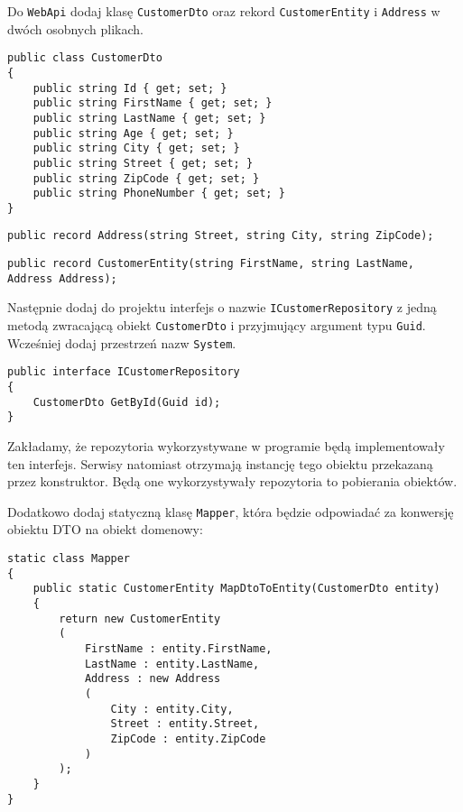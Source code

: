 Do \texttt{WebApi} dodaj klasę \texttt{CustomerDto} oraz rekord \texttt{CustomerEntity} i \texttt{Address} w dwóch osobnych plikach.
\begin{lstlisting}[caption = Klasa \texttt{CustomerDto}]
public class CustomerDto
{
	public string Id { get; set; }
	public string FirstName { get; set; }
	public string LastName { get; set; }
	public string Age { get; set; }
	public string City { get; set; }
	public string Street { get; set; }
	public string ZipCode { get; set; }
	public string PhoneNumber { get; set; }
}
\end{lstlisting}
\begin{lstlisting}[caption = Rekord \texttt{Address}]
public record Address(string Street, string City, string ZipCode);
\end{lstlisting}
\begin{lstlisting}[caption = Rekord \texttt{CustomerEntity}]
public record CustomerEntity(string FirstName, string LastName, Address Address);
\end{lstlisting}

Następnie dodaj do projektu interfejs o nazwie \texttt{ICustomerRepository} z jedną metodą zwracającą obiekt \texttt{CustomerDto} i przyjmujący argument typu \texttt{Guid}. Wcześniej dodaj przestrzeń nazw \texttt{System}.
\begin{lstlisting}[caption = Interfejs \texttt{ICustomerRepository}]
public interface ICustomerRepository
{
	CustomerDto GetById(Guid id);
}
\end{lstlisting}
Zakładamy, że repozytoria wykorzystywane w programie będą implementowały ten interfejs. Serwisy natomiast otrzymają instancję tego obiektu przekazaną przez konstruktor. Będą one wykorzystywały repozytoria to pobierania obiektów. 

Dodatkowo dodaj statyczną klasę \texttt{Mapper}, która będzie odpowiadać za konwersję obiektu DTO na obiekt domenowy:
\begin{lstlisting}[caption = Interfejs \texttt{ICustomerRepository}]
static class Mapper
{
	public static CustomerEntity MapDtoToEntity(CustomerDto entity)
	{
		return new CustomerEntity
		(
			FirstName : entity.FirstName,
			LastName : entity.LastName,
			Address : new Address
			(
				City : entity.City,
				Street : entity.Street,
				ZipCode : entity.ZipCode
			)
		);
	}
}
\end{lstlisting}

